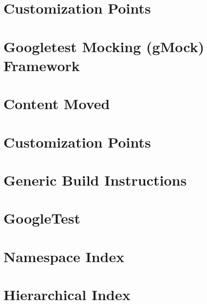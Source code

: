 \let\mypdfximage\pdfximage\def\pdfximage{\immediate\mypdfximage}\documentclass[twoside]{book}
\newcommand{\+}{\discretionary{\mbox{\scriptsize$\hookleftarrow$}}{}{}}
\begin{document}
\chapter{Customization Points}
\label{md_build__deps_googletest_src_googlemock_include_gmock_internal_custom_README}

\chapter{Googletest Mocking (g\+Mock) Framework}
\label{md_build__deps_googletest_src_googlemock_README}

\chapter{Content Moved}
\label{md_build__deps_googletest_src_googletest_docs_README}

\chapter{Customization Points}
\label{md_build__deps_googletest_src_googletest_include_gtest_internal_custom_README}

\chapter{Generic Build Instructions}
\label{md_build__deps_googletest_src_googletest_README}

\chapter{Google\+Test}
\label{md_build__deps_googletest_src_README}

\chapter{Namespace Index}

\chapter{Hierarchical Index}

\end{document}

